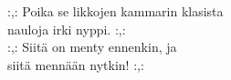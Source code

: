 
:,: Poika se likkojen kammarin klasista  \\ nauloja irki nyppi. :,: \\ :,: Siitä on menty ennenkin, ja  \\ siitä mennään nytkin! :,: